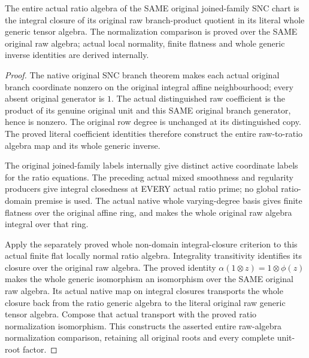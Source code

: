 \begin{lemma}
\label{lem:kn-adapted-whole-normalization}
\leanok
{}
The entire actual ratio algebra of the SAME original joined-family SNC
chart is the integral closure of its original raw branch-product quotient in
its literal whole generic tensor algebra. The normalization comparison is
proved over the SAME original raw algebra; actual local normality, finite
flatness and whole generic inverse identities are derived internally.
\end{lemma}
\begin{proof}
The native original SNC branch theorem makes each actual original branch
coordinate nonzero on the original integral affine neighbourhood; every
absent original generator is $1$. The actual distinguished raw coefficient
is the product of its genuine original unit and this SAME original branch
generator, hence is nonzero. The original row degree is unchanged at its
distinguished copy. The proved literal coefficient identities
therefore construct the entire raw-to-ratio algebra map and its whole
generic inverse.

The original joined-family labels internally give distinct active coordinate
labels for the ratio equations. The preceding actual mixed smoothness and
regularity producers give integral closedness at EVERY actual ratio prime;
no global ratio-domain premise is used. The actual native whole varying-degree
basis gives finite flatness over the original affine ring, and makes the
whole original raw algebra integral over that ring.

Apply the separately proved whole non-domain integral-closure criterion to
this actual finite flat locally normal ratio algebra. Integrality transitivity
identifies its closure over the original raw algebra. The proved identity
$\alpha(1\otimes z)=1\otimes\phi(z)$ makes the whole generic isomorphism an
isomorphism over the SAME original raw algebra. Its actual native map on
integral closures transports the whole closure back from the ratio generic
algebra to the literal original raw generic tensor algebra. Compose that
actual transport with the proved ratio normalization isomorphism. This
constructs the asserted entire raw-algebra normalization comparison, retaining
all original roots and every complete unit-root factor.
\end{proof}

